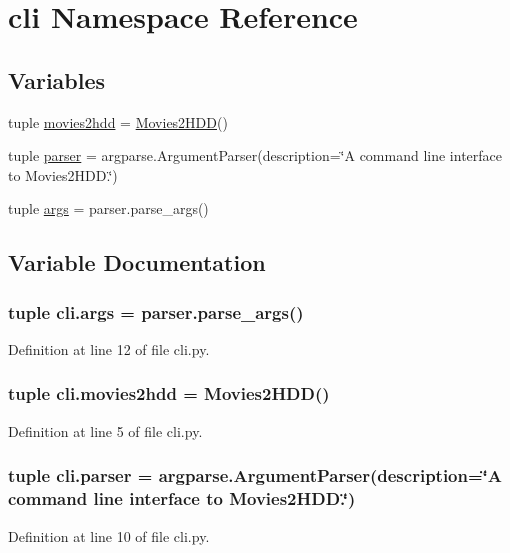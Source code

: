 \hypertarget{namespacecli}{\section{cli Namespace Reference}
\label{namespacecli}
}
\subsection*{Variables}
\begin{DoxyCompactItemize}
\item 
tuple \hyperlink{namespacecli_a8da2f3b3f7715bbff0062a36c4fbdbfb}{movies2hdd} = \hyperlink{classmovies2hdd_1_1_movies2_h_d_d}{Movies2\-H\-D\-D}()
\item 
tuple \hyperlink{namespacecli_a4395e17f90f038ddf186198428ef7207}{parser} = argparse.\-Argument\-Parser(description=\char`\"{}A command line interface to Movies2\-H\-D\-D.\char`\"{})
\item 
tuple \hyperlink{namespacecli_a4c496116e0c45ab1336943b2bdeca177}{args} = parser.\-parse\-\_\-args()
\end{DoxyCompactItemize}


\subsection{Variable Documentation}
\hypertarget{namespacecli_a4c496116e0c45ab1336943b2bdeca177}{
\subsubsection[{args}]{\setlength{\rightskip}{0pt plus 5cm}tuple cli.\-args = parser.\-parse\-\_\-args()}}\label{namespacecli_a4c496116e0c45ab1336943b2bdeca177}


Definition at line 12 of file cli.\-py.

\hypertarget{namespacecli_a8da2f3b3f7715bbff0062a36c4fbdbfb}{
\subsubsection[{movies2hdd}]{\setlength{\rightskip}{0pt plus 5cm}tuple cli.\-movies2hdd = {\bf Movies2\-H\-D\-D}()}}\label{namespacecli_a8da2f3b3f7715bbff0062a36c4fbdbfb}


Definition at line 5 of file cli.\-py.

\hypertarget{namespacecli_a4395e17f90f038ddf186198428ef7207}{
\subsubsection[{parser}]{\setlength{\rightskip}{0pt plus 5cm}tuple cli.\-parser = argparse.\-Argument\-Parser(description=\char`\"{}A command line interface to Movies2\-H\-D\-D.\char`\"{})}}\label{namespacecli_a4395e17f90f038ddf186198428ef7207}


Definition at line 10 of file cli.\-py.

